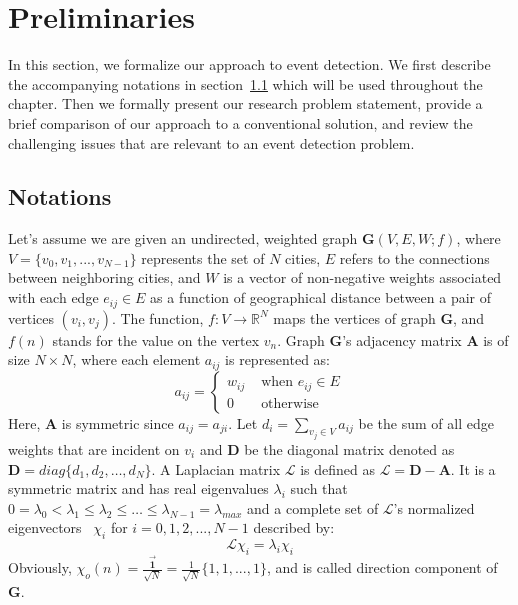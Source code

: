 \section{Preliminaries} \label{sec:preliminaries}
In this section, we formalize our approach to event detection.
We first describe the accompanying notations in section~\ref{sec:notations} which will be used throughout the chapter.
Then we formally present our research problem statement, provide a brief comparison of our approach to a conventional solution, and review the challenging issues that are relevant to an event detection problem.
\subsection{Notations}
\label{sec:notations}
Let's assume we are given an undirected, weighted graph $\mathbf{G}(V,E,W;f)$, where $V=\{v_0,v_1,...,v_{N-1}\}$ represents the set of $N$ cities, $E$ refers to the connections between neighboring cities, and $W$ is a vector of non-negative weights associated with each edge $e_{ij}\in E$ as a function of geographical distance between a pair of vertices $(v_{i}, v_{j})$. The function, $f: V \rightarrow {\mathbb{R}}^N$ maps the vertices of graph $\mathbf{G}$, and $f(n)$ stands for the value on the vertex $v_n$. Graph $\mathbf{G}$'s adjacency matrix $\mathbf{A}$ is of size $N\times N$, where each element $a_{ij}$ is represented as:
\begin{equation}
a_{ij} = \left\{ \begin{array}{rl}
 w_{ij} &\mbox{ when $e_{ij}\in {E}$} \\
  0 &\mbox{ otherwise}
       \end{array} \right.
\end{equation}
Here, $\mathbf{A}$ is symmetric since $a_{ij}=a_{ji}$.
Let $d_i=\sum\limits_{v_j \in V}a_{ij}$ be the sum of all edge weights that are incident on $v_i$ and $\mathbf{D}$ be the diagonal matrix denoted as $\mathbf{D}=diag\{d_1,d_2,\ldots,d_N\}$. A Laplacian matrix $\mathcal{L}$ is defined as $\mathcal{L}=\mathbf{D-A}$. It is a symmetric matrix and has real eigenvalues $\lambda_{i}$ such that $0 = \lambda_{0} < \lambda_{1} \leq \lambda_{2} \leq \ldots \leq \lambda_{N-1} = \lambda_{max}$ and a complete set of $\mathcal{L}$'s normalized eigenvectors~\cite{bapat2010graphs} $\chi_{i}$ for $i=0,1,2,...,N-1$ described by:
\begin{equation}
\label{eq:eigenvalues}
\mathcal{L}\chi_{i}=\lambda_{i}\chi_{i}
\end{equation}
Obviously, $\chi_o(n)=\frac{\vec{\textbf{1}}}{\sqrt{N}}=\frac{1}{\sqrt{N}}\{1,1,...,1\}$, and is called direction component of $\mathbf{G}$.

